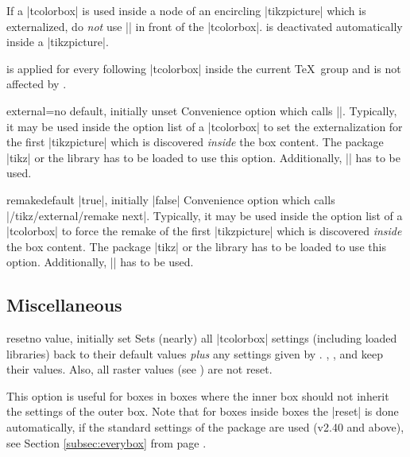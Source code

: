 \begin{marker}
If a |tcolorbox| is used inside a node of an encircling |tikzpicture| which is externalized,
do \emph{not} use |\tikzexternaldisable| in front of the |tcolorbox|.
 is deactivated automatically inside a |tikzpicture|.
\end{marker}

\begin{marker}
 is applied for every following |tcolorbox|
inside the current \TeX\ group and is not affected by .
\end{marker}

\begin{docTcbKey}{external}{=}{no default, initially unset}
  Convenience option which calls ||. Typically,
  it may be used inside the option list of a |tcolorbox| to set the
  externalization  for the first |tikzpicture| which is discovered
  \emph{inside} the box content.
  The package |tikz| \cite{tantau:tikz_and_pgf} or the library  has to be loaded to use this option.
  Additionally, |\usetikzlibrary{external}| has to be used.
\end{docTcbKey}

\begin{docTcbKey}{remake}{}{default |true|, initially |false|}
  Convenience option which calls |/tikz/external/remake next|. Typically,
  it may be used inside the option list of a |tcolorbox| to force the remake
  of the first |tikzpicture| which is discovered \emph{inside} the box content.
  The package |tikz| \cite{tantau:tikz_and_pgf} or the library  has to be loaded to use this option.
  Additionally, |\usetikzlibrary{external}| has to be used.
\end{docTcbKey}


\clearpage
\subsection{Miscellaneous}
\begin{docTcbKey}{reset}{}{no value, initially set}
Sets (nearly) all |tcolorbox| settings (including loaded libraries) back to their default values
\emph{plus} any settings given by .
, , and
 keep their values.
Also, all raster values (see ) are not reset.

This option is useful for boxes in boxes where the inner box should not inherit
the settings of the outer box.
Note that for boxes inside boxes the |reset| is done automatically, if the
standard settings of the package are used (v2.40 and above), see
Section \ref{subsec:everybox} from page \pageref{subsec:everybox}.
\end{docTcbKey}




